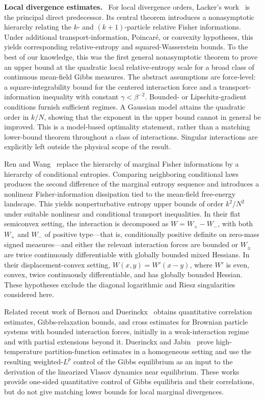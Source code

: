 \documentclass[11pt,reqno]{amsart}
\numberwithin{equation}{section}
\theoremstyle{plain}
\theoremstyle{remark}
\newcommand{\be}{\beta}
\newcommand{\parheading}[1]{\par\medskip\noindent\textbf{#1}\ }
\begin{document}
\parheading{Local divergence estimates.}
For local divergence orders, Lacker's work~\cite{Lacker2022} is the principal direct predecessor.  Its central theorem introduces a nonasymptotic hierarchy relating the \(k\)- and \((k+1)\)-particle relative Fisher informations.  Under additional transport-information, Poincar\'e, or convexity hypotheses, this yields corresponding relative-entropy and squared-Wasserstein bounds.  To the best of our knowledge, this was the first general nonasymptotic theorem to prove an upper bound at the quadratic local relative-entropy scale for a broad class of continuous mean-field Gibbs measures.  The abstract assumptions are force-level: a square-integrability bound for the centered interaction force and a transport-information inequality with constant \(\gamma<\be^{-2}\).  Bounded- or Lipschitz-gradient conditions furnish sufficient regimes.  A Gaussian model attains the quadratic order in \(k/N\), showing that the exponent in the upper bound cannot in general be improved.  This is a model-based optimality statement, rather than a matching lower-bound theorem throughout a class of interactions.  Singular interactions are explicitly left outside the physical scope of the result.

Ren and Wang~\cite{RenWang2024} replace the hierarchy of marginal Fisher informations by a hierarchy of conditional entropies.  Comparing neighboring conditional laws produces the second difference of the marginal entropy sequence and introduces a nonlinear Fisher-information dissipation tied to the mean-field free-energy landscape.  This yields nonperturbative entropy upper bounds of order \(k^2/N^2\) under suitable nonlinear and conditional transport inequalities.  In their flat semiconvex setting, the interaction is decomposed as \(W=W_+-W_-\), with both \(W_+\) and \(W_-\) of positive type---that is, conditionally positive definite on zero-mass signed measures---and either the relevant interaction forces are bounded or \(W_\pm\) are twice continuously differentiable with globally bounded mixed Hessians.  In their displacement-convex setting, \(W(x,y)=W'(x-y)\), where \(W'\) is even, convex, twice continuously differentiable, and has globally bounded Hessian.  These hypotheses exclude the diagonal logarithmic and Riesz singularities considered here.

Related recent work of Bernou and Duerinckx~\cite{BernouDuerinckx2025} obtains quantitative correlation estimates, Gibbs-relaxation bounds, and cross estimates for Brownian particle systems with bounded interaction forces, initially in a weak-interaction regime and with partial extensions beyond it.  Duerinckx and Jabin~\cite{DuerinckxJabin2026} prove high-temperature partition-function estimates in a homogeneous setting and use the resulting weighted-\(L^p\) control of the Gibbs equilibrium as an input to the derivation of the linearized Vlasov dynamics near equilibrium.  These works provide one-sided quantitative control of Gibbs equilibria and their correlations, but do not give matching lower bounds for local marginal divergences.
\end{document}
